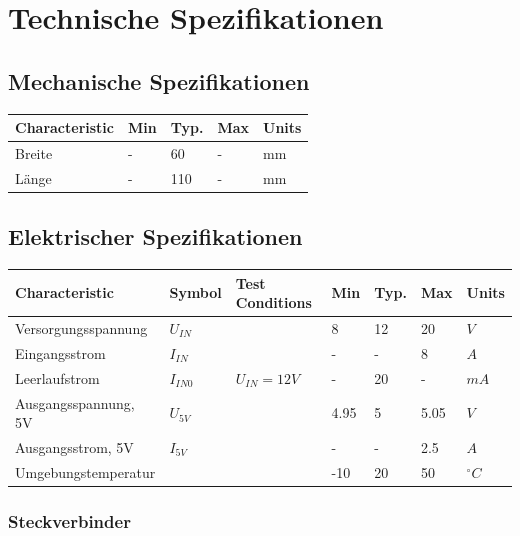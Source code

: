 \documentclass[a4paper,10pt]{article}
\begin{document}
\section{Technische Spezifikationen}

\subsection{Mechanische Spezifikationen}

\begin{center}
    \begin{tabular}{| l | l | l | l | l |}
    \hline
    \textbf{Characteristic} & \textbf{Min} & \textbf{Typ.} & \textbf{Max} & \textbf{Units} \\ \hline
    Breite & - & 60 & - & mm \\ \hline
    Länge & - & 110 & - & mm \\ \hline
    
    \end{tabular}
\end{center}

\subsection{Elektrischer Spezifikationen}

\begin{center}
    \begin{tabular}{| l | l | l | l | l | l | l |}
    \hline
    \textbf{Characteristic} 	& \textbf{Symbol} 	& \textbf{Test Conditions} 	& \textbf{Min} 	& \textbf{Typ.} & \textbf{Max} 	& \textbf{Units} \\ \hline
    Versorgungsspannung 	& $U_{IN}$ 		& 				& 8 		& 12 		& 20 		& $V$ \\ \hline
    Eingangsstrom 		& $I_{IN}$ 		& 				& - 		& - 		& 8 		& $A$ \\ \hline
    Leerlaufstrom 		& $I_{IN0}$ 		& $U_{IN} = 12V$		& - 		& 20 		& - 		& $mA$ \\ \hline
    Ausgangsspannung, 5V	& $U_{5V}$ 		& 				& 4.95 		& 5 		& 5.05 		& $V$ \\ \hline
    Ausgangsstrom, 5V 		& $I_{5V}$ 		& 				& - 		& - 		& 2.5 		& $A$ \\ \hline
    Umgebungstemperatur 	&  			& 				& -10 		& 20 		& 50 		& $^\circ C$ \\ \hline
    \end{tabular}
\end{center}

\subsubsection{Steckverbinder}
\end{document}
